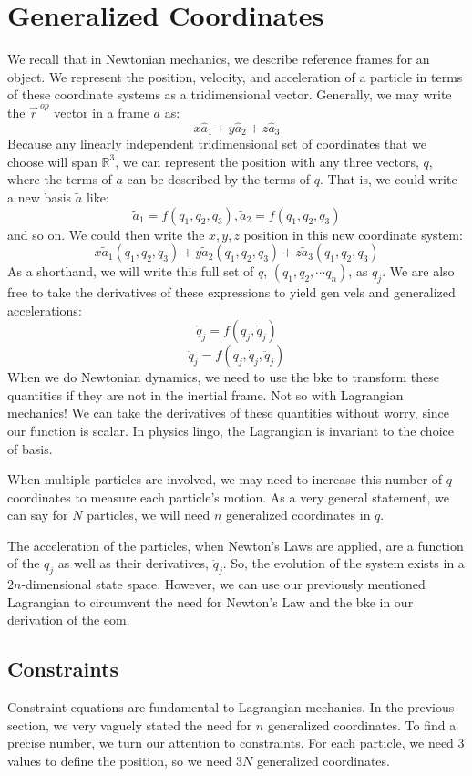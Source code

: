 \documentclass[10pt, openany, titlepage]{book}
\theoremstyle{definition}
\begin{document}
\section{Generalized Coordinates}
We recall that in Newtonian mechanics, we describe reference frames for an object. We represent the position, velocity, and acceleration of a particle in terms of these coordinate systems as a tridimensional vector. 
Generally, we may write the $\vec{r}^{\ op}$  vector in a frame $a$ as:
$$x\hat{a}_1+y\hat{a}_2+z\hat{a}_3$$
Because any linearly independent tridimensional set of coordinates that we choose will span $\mathbb{R}^3$, we can represent the position with any three vectors, $q$, where the terms of $a$ can be described by the terms of $q$. That is, we could write a new basis $\tilde{a}$ like:
$$\tilde{a}_1=f(q_1,q_2,q_3), \tilde{a}_2=f(q_1,q_2,q_3)$$
and so on. We could then write the $x,y,z$ position in this new coordinate system:
$$x\tilde{a}_1\left(q_1,q_2,q_3\right)+y\tilde{a}_2\left(q_1,q_2,q_3\right)+z\tilde{a}_3\left(q_1,q_2,q_3\right)$$
As a shorthand, we will write this full set of $q$, $\left(q_1,q_2,\cdots q_n\right)$, as $q_j$. We are also free to take the derivatives of these expressions to yield \glspl{gen vel} and generalized accelerations:
$$\dot{q}_j=f(q_j, \dot{q}_j)$$
$$\ddot{q}_j=f(q_j, \dot{q}_j, \ddot{q}_j)$$
When we do Newtonian dynamics, we need to use the \gls{bke} to transform these quantities if they are not in the \gls{inertial frame}. Not so with \gls{Lagrangian} mechanics! We can take the derivatives of these quantities without worry, since our function is scalar. In physics lingo, the \gls{Lagrangian} is invariant to the choice of basis.

When multiple particles are involved, we may need to increase this number of $q$ coordinates to measure each particle's motion. As a very general statement, we can say for $N$ particles, we will need $n$ \glspl{generalized coordinate} in $q$. 

The acceleration of the particles, when Newton's Laws are applied, are a function of the $q_j$ as well as their derivatives, $\dot{q}_j$. So, the evolution of the system exists in a $2n$-dimensional state space. However, we can use our previously mentioned \gls{Lagrangian} to circumvent the need for Newton's Law and the \gls{bke} in our derivation of the \gls{eom}.

\subsection{Constraints}\label{sec:constaints}
Constraint equations are fundamental to \gls{Lagrangian} mechanics. In the previous section, we very vaguely stated the need for $n$ \glspl{generalized coordinate}. To find a precise number, we turn our attention to constraints. For each particle, we need 3 values to define the position, so we need $3N$ \glspl{generalized coordinate}. 
\end{document}
